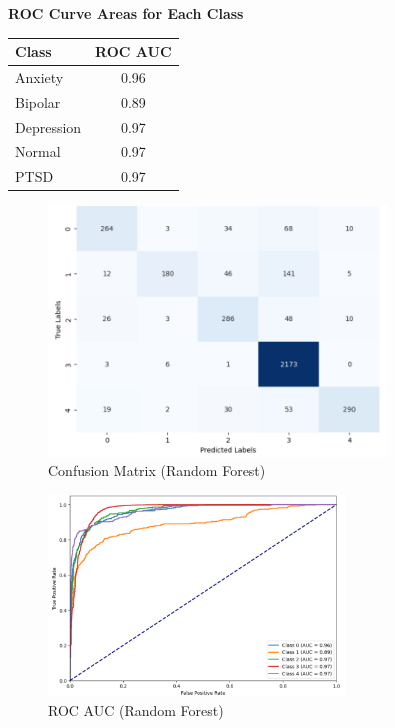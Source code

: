 \vspace{0.25em}

\begin{center}
    \textbf{ROC Curve Areas for Each Class} \\[0.5em]
    \begin{tabular}{|l|c|}
        \hline
        \textbf{Class}  & \textbf{ROC AUC} \\ \hline
        Anxiety         & 0.96            \\ \hline
        Bipolar         & 0.89            \\ \hline
        Depression      & 0.97            \\ \hline
        Normal          & 0.97            \\ \hline
        PTSD            & 0.97            \\ \hline
    \end{tabular}
\end{center}

\vspace{0.25em}

\begin{figure}[h!]  
    \centering
    \includegraphics[width=0.8\textwidth]{Images/RF Confusion Matrix.png}  
    \caption{Confusion Matrix (Random Forest)}
    \label{RFCM}  %
\end{figure}

\begin{figure}[h!]  
    \centering
    \includegraphics[width=0.7\textwidth]{Images/RF ROC.png}  
    \caption{ROC AUC (Random Forest)}
    \label{RFROC}  %
\end{figure}

